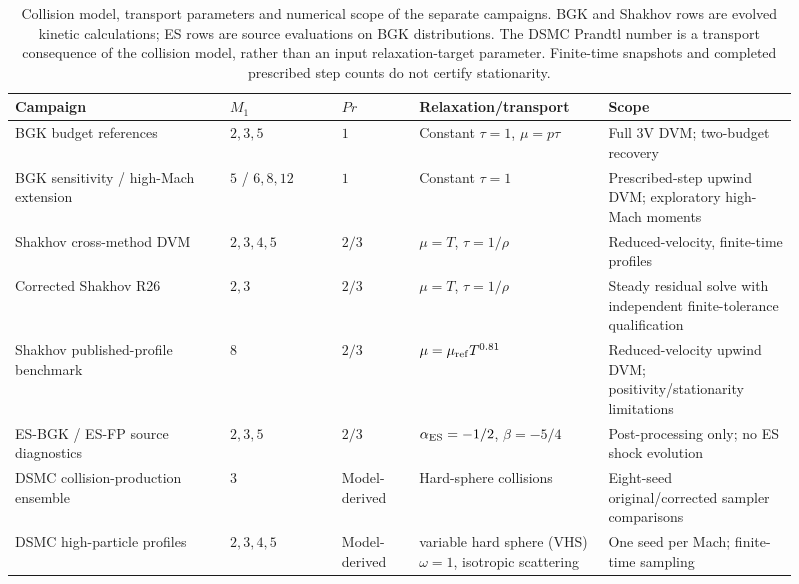 \documentclass[lineno,paper]{JFM-FLM_Au}
\newenvironment{revision}{\begingroup\colorlet{shadecolor}{revisionyellow}\begin{shaded}}{\end{shaded}\endgroup}
\newenvironment{revision}{}{}
\begin{document}
\begin{table}
\centering
\begin{revision}
\caption{Collision model, transport parameters and numerical scope of the separate campaigns. BGK and Shakhov rows are evolved kinetic calculations; ES rows are source evaluations on BGK distributions. The DSMC Prandtl number is a transport consequence of the collision model, rather than an input relaxation-target parameter. Finite-time snapshots and completed prescribed step counts do not certify stationarity.}
\label{tab:solver_campaigns}
\end{revision}
\small\setlength{\tabcolsep}{3pt}
\begin{tabular}{p{0.25\linewidth}p{0.13\linewidth}p{0.09\linewidth}p{0.22\linewidth}p{0.22\linewidth}}
\toprule
Campaign & $M_1$ & $Pr$ & Relaxation/transport & Scope\\
\midrule
BGK budget references & $2,3,5$ & $1$ & Constant $\tau=1$, $\mu=p\tau$ & Full 3V DVM; two-budget recovery\\
BGK sensitivity / high-Mach extension & $5$ / $6,8,12$ & $1$ & Constant $\tau=1$ & Prescribed-step upwind DVM; exploratory high-Mach moments\\
Shakhov cross-method DVM & $2,3,4,5$ & $2/3$ & $\mu=T$, $\tau=1/\rho$ & Reduced-velocity, finite-time profiles\\
Corrected Shakhov R26 & $2,3$ & $2/3$ & $\mu=T$, $\tau=1/\rho$ & Steady residual solve with independent finite-tolerance qualification\\
Shakhov published-profile benchmark & $8$ & $2/3$ & $\mu=\mu_{\rm ref}T^{0.81}$ & Reduced-velocity upwind DVM; positivity/stationarity limitations\\
ES-BGK / ES-FP source diagnostics & $2,3,5$ & $2/3$ & $\alpha_{\rm ES}=-1/2$, $\beta=-5/4$ & Post-processing only; no ES shock evolution\\
DSMC collision-production ensemble & $3$ & Model-derived & Hard-sphere collisions & Eight-seed original/corrected sampler comparisons\\
DSMC high-particle profiles & $2,3,4,5$ & Model-derived & variable hard sphere (VHS) $\omega=1$, isotropic scattering & One seed per Mach; finite-time sampling\\
\bottomrule
\end{tabular}
\end{table}
\end{document}
